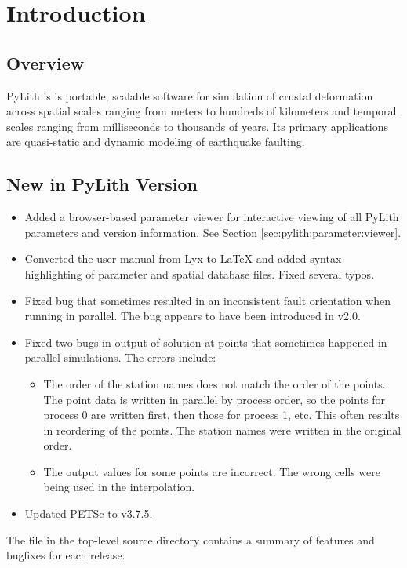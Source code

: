 
\chapter{Introduction}


\section{Overview}

PyLith is is portable, scalable software for simulation of crustal
deformation across spatial scales ranging from meters to hundreds of
kilometers and temporal scales ranging from milliseconds to thousands
of years. Its primary applications are quasi-static and dynamic
modeling of earthquake faulting.

\section{New in PyLith Version \pylithVersionNumber}
\begin{itemize}
\item Added a browser-based parameter viewer for interactive viewing
  of all PyLith parameters and version information. See Section
  \ref{sec:pylith:parameter:viewer}.
\item Converted the user manual from Lyx to LaTeX and added syntax
  highlighting of parameter and spatial database files. Fixed several
  typos.
\item Fixed bug that sometimes resulted in an inconsistent fault
  orientation when running in parallel. The bug appears to have been
  introduced in v2.0.
\item Fixed two bugs in output of solution at points that sometimes
  happened in parallel simulations. The errors include:
  \begin{itemize}
  \item The order of the station names does not match the order of the
    points. The point data is written in parallel by process order, so
    the points for process 0 are written first, then those for process
    1, etc. This often results in reordering of the points. The
    station names were written in the original order.
  \item The output values for some points are incorrect. The wrong
    cells were being used in the interpolation.
  \end{itemize}
\item Updated PETSc to v3.7.5.
\end{itemize}
The  file in the top-level source directory contains
a summary of features and bugfixes for each release.


